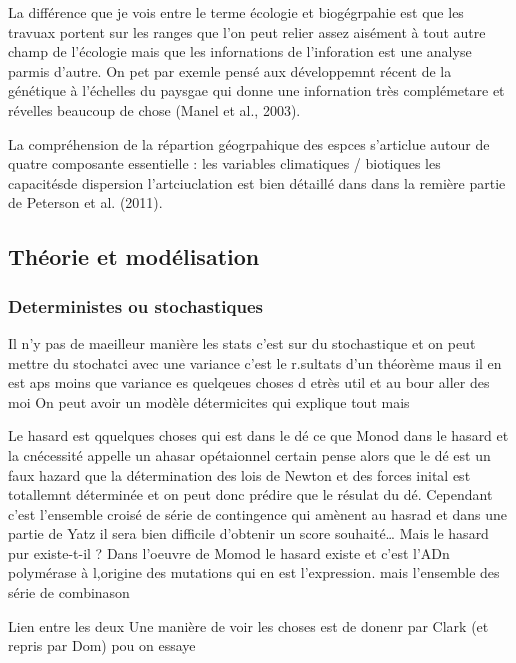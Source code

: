 La différence que je vois entre le terme écologie et biogégrpahie est
que les travuax portent sur les ranges que l'on peut relier assez
aisément à tout autre champ de l'écologie mais que les infornations de
l'inforation est une analyse parmis d'autre. On pet par exemle pensé aux
développemnt récent de la génétique à l'échelles du paysgae qui donne
une infornation très complémetare et révelles beaucoup de chose (Manel
et al., 2003).

La compréhension de la répartion géogrpahique des espces s'articlue
autour de quatre composante essentielle : les variables climatiques /
biotiques les capacitésde dispersion l'artciuclation est bien détaillé
dans dans la remière partie de Peterson et al. (2011).

\subsection*{Théorie et
modélisation}\label{thuxe9orie-et-moduxe9lisation}

\subsubsection{Deterministes ou
stochastiques}\label{deterministes-ou-stochastiques}

Il n'y pas de maeilleur manière les stats c'est sur du stochastique et
on peut mettre du stochatci avec une variance c'est le r.sultats d'un
théorème maus il en est aps moins que variance es quelqeues choses d
etrès util et au bour aller des moi On peut avoir un modèle détermicites
qui explique tout mais

Le hasard est qquelques choses qui est dans le dé ce que Monod dans le
hasard et la cnécessité appelle un ahasar opétaionnel certain pense
alors que le dé est un faux hazard que la détermination des lois de
Newton et des forces inital est totallemnt déterminée et on peut donc
prédire que le résulat du dé. Cependant c'est l'ensemble croisé de série
de contingence qui amènent au hasrad et dans une partie de Yatz il sera
bien difficile d'obtenir un score souhaité\ldots{} Mais le hasard pur
existe-t-il ? Dans l'oeuvre de Momod le hasard existe et c'est l'ADn
polymérase à l,origine des mutations qui en est l'expression. mais
l'ensemble des série de combinason

Lien entre les deux Une manière de voir les choses est de donenr par
Clark (et repris par Dom) pou on essaye


